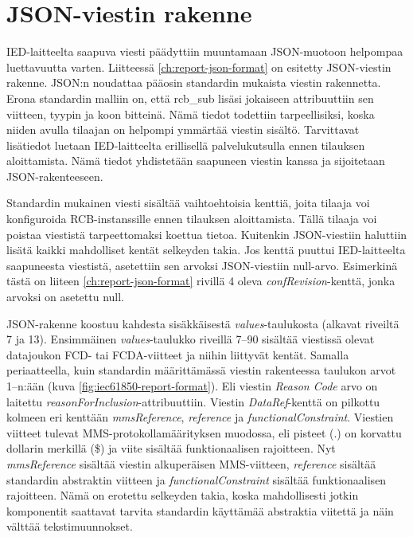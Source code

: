 \section{JSON-viestin rakenne}
IED-laitteelta saapuva viesti päädyttiin muuntamaan JSON-muotoon helpompaa luettavuutta varten. Liitteessä \ref{ch:report-json-format} on esitetty JSON-viestin rakenne. JSON:n noudattaa pääosin standardin mukaista viestin rakennetta. Erona standardin malliin on, että rcb\_sub lisäsi jokaiseen attribuuttiin sen viitteen, tyypin ja koon bitteinä. Nämä tiedot todettiin tarpeellisiksi, koska niiden avulla tilaajan on helpompi ymmärtää viestin sisältö. Tarvittavat lisätiedot luetaan IED-laitteelta erillisellä palvelukutsulla ennen tilauksen aloittamista. Nämä tiedot yhdistetään saapuneen viestin kanssa ja sijoitetaan JSON-rakenteeseen.

Standardin mukainen viesti sisältää vaihtoehtoisia kenttiä, joita tilaaja voi konfiguroida RCB-instanssille ennen tilauksen aloittamista. Tällä tilaaja voi poistaa viestistä tarpeettomaksi koettua tietoa. Kuitenkin JSON-viestiin haluttiin lisätä kaikki mahdolliset kentät selkeyden takia. Jos kenttä puuttui IED-laitteelta saapuneesta viestistä, asetettiin sen arvoksi JSON-viestiin null-arvo. Esimerkinä tästä on liiteen \ref{ch:report-json-format} rivillä 4 oleva \emph{confRevision}-kenttä, jonka arvoksi on asetettu null.



JSON-rakenne koostuu kahdesta sisäkkäisestä \emph{values}-taulukosta (alkavat riveiltä 7 ja 13). Ensimmäinen \emph{values}-taulukko riveillä 7--90 sisältää viestissä olevat datajoukon FCD- tai FCDA-viitteet ja niihin liittyvät kentät. Samalla periaatteella, kuin standardin määrittämässä viestin rakenteessa taulukon arvot 1--n:ään (kuva \ref{fig:iec61850-report-format}). Eli viestin \emph{Reason Code} arvo on laitettu \emph{reasonForInclusion}-attribuuttiin. Viestin \emph{DataRef}-kenttä on pilkottu kolmeen eri kenttään \emph{mmsReference}, \emph{reference} ja \emph{functionalConstraint}. Viestien viitteet tulevat MMS-protokollamäärityksen muodossa, eli pisteet (.) on korvattu dollarin merkillä (\$) ja viite sisältää funktionaalisen rajoitteen. Nyt \emph{mmsReference} sisältää viestin alkuperäisen MMS-viitteen, \emph{reference} sisältää standardin abstraktin viitteen ja \emph{functionalConstraint} sisältää funktionaalisen rajoitteen. Nämä on erotettu selkeyden takia, koska mahdollisesti jotkin komponentit saattavat tarvita standardin käyttämää abstraktia viitettä ja näin välttää tekstimuunnokset.

